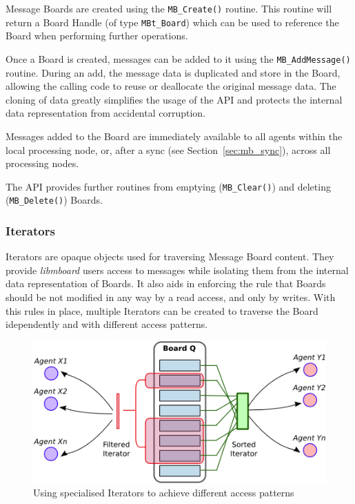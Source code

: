 Message Boards are created using the \texttt{MB\_Create()} routine. This routine will return a Board Handle (of type \texttt{MBt\_Board}) which can be used to reference the Board when performing further operations.

Once a Board is created, messages can be added to it using the \texttt{MB\_AddMessage()} routine. During an add, the message data is duplicated and store in the Board, allowing the calling code to reuse or deallocate the original message data. The cloning of data greatly simplifies the usage of the API and protects the internal data representation from accidental corruption. 

Messages added to the Board are immediately available to all agents within the local processing node, or, after a sync (see Section~\ref{sec:mb_sync}), across all processing nodes.

The API provides further routines from emptying (\texttt{MB\_Clear()}) and deleting  (\texttt{MB\_Delete()}) Boards.

\subsubsection{Iterators}
\label{sec:mb_interators}

Iterators are opaque objects used for traversing Message Board content. They provide \textit{libmboard} users access to messages while isolating them from the internal data representation of Boards. It also aids in enforcing the rule that Boards should be not modified in any way by a read access, and only by writes. With this rules in place, multiple Iterators can be created to traverse the Board idependently and with different access patterns.

\begin{figure}[h]
 \centering
  \includegraphics[scale=0.8]{iterator.png}
 \caption{Using specialised Iterators to achieve different access patterns}
 \label{fig:mb_iterators}
\end{figure}

